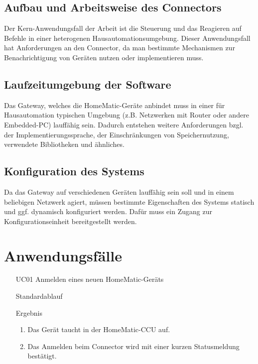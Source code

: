\subsection{Aufbau und Arbeitsweise des Connectors}

Der Kern-Anwendungsfall der Arbeit ist die Steuerung und das Reagieren auf Befehle in einer
heterogenen Hausautomationsumgebung.
Dieser Anwendungsfall hat Anforderungen an den Connector, da man bestimmte Mechanismen zur
Benachrichtigung von Geräten nutzen oder implementieren muss.

\subsection{Laufzeitumgebung der Software}

Das Gateway, welches die HomeMatic-Geräte anbindet muss in einer für Hausautomation typischen
Umgebung (z.B. Netzwerken mit Router oder andere Embedded-PC) lauffähig sein.
Dadurch entstehen weitere Anforderungen bzgl. der Implementierungssprache, der Einschränkungen
von Speichernutzung, verwendete Bibliotheken und ähnliches.

\subsection{Konfiguration des Systems}

Da das Gateway auf verschiedenen Geräten lauffähig sein soll und in einem beliebigen Netzwerk
agiert, müssen bestimmte Eigenschaften des Systems statisch und ggf. dynamisch konfiguriert werden.
Dafür muss ein Zugang zur Konfigurationseinheit bereitgestellt werden.

\section{Anwendungsfälle}
\label{ana_uc}

\begin{itemize}
\item[UC01] Anmelden eines neuen HomeMatic-Geräts
\item[Standardablauf]
\item[Ergebnis]
 \begin{enumerate}
 \item Das Gerät taucht in der HomeMatic-CCU auf. 
 \item Das Anmelden beim Connector wird mit einer kurzen Statusmeldung bestätigt.
 \end{enumerate}
\end{itemize}

